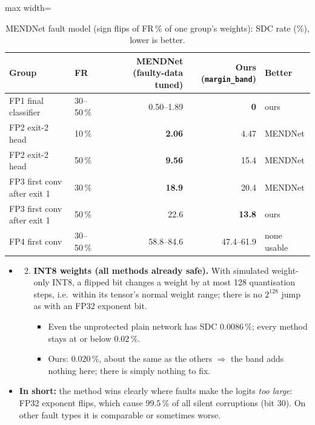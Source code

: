\documentclass[10pt,a4paper]{article}
\newcommand{\meth}[1]{\texttt{#1}}
\newcommand{\ours}{\meth{margin\_band}}
\begin{document}
\begin{table}[H]
\centering\small
\caption{MENDNet fault model (sign flips of FR\,\% of one group's weights): SDC rate (\%), lower is better.}
\begin{adjustbox}{max width=\linewidth}
\begin{tabular}{@{}llrrl@{}}
\toprule
Group & FR & MENDNet (faulty-data tuned) & Ours (\ours) & Better \\
\midrule
FP1 final classifier        & 30--50\,\% & 0.50--1.89 & \textbf{0}      & ours \\
FP2 exit-2 head             & 10\,\%     & \textbf{2.06} & 4.47        & MENDNet \\
FP2 exit-2 head             & 50\,\%     & \textbf{9.56} & 15.4        & MENDNet \\
FP3 first conv after exit 1 & 30\,\%     & \textbf{18.9} & 20.4        & MENDNet \\
FP3 first conv after exit 1 & 50\,\%     & 22.6       & \textbf{13.8}   & ours \\
FP4 first conv              & 30--50\,\% & 58.8--84.6 & 47.4--61.9      & none usable \\
\bottomrule
\end{tabular}
\end{adjustbox}
\end{table}

\begin{itemize}
  \item[] \begin{enumerate}
    \setcounter{enumi}{1}
    \item \textbf{INT8 weights (all methods already safe).} With simulated weight-only INT8, a flipped bit changes
          a weight by at most 128 quantisation steps, i.e.\ within its tensor's normal weight range; there is no
          $2^{128}$ jump as with an FP32 exponent bit.
    \begin{itemize}
      \item Even the unprotected plain network has SDC $0.0086\,\%$; every method stays at or below $0.02\,\%$.
      \item Ours: $0.020\,\%$, about the same as the others $\Rightarrow$ the band adds nothing here; there is
            simply nothing to fix.
    \end{itemize}
  \end{enumerate}
  \item \textbf{In short:} the method wins clearly where faults make the logits \emph{too large}: FP32 exponent
        flips, which cause $99.5\,\%$ of all silent corruptions (bit 30). On other fault types it is comparable
        or sometimes worse.
\end{itemize}
\end{document}
